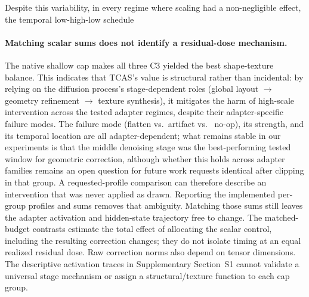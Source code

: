 \documentclass[times,twocolumn,final]{elsarticle}
\providecommand{\DIFadd}[1]{{\protect\color{blue} \sf #1}} %
\providecommand{\DIFdel}[1]{{\protect\color{red} \scriptsize #1}} %
\providecommand{\DIFaddbegin}{} %
\providecommand{\DIFaddend}{} %
\providecommand{\DIFdelbegin}{} %
\providecommand{\DIFdelend}{} %
\begin{document}
\DIFdelbegin \DIFdel{Despite this variability, in every regime where scaling had a non-negligible effect, the temporal low-high-low schedule }\DIFdelend \DIFaddbegin \paragraph{Matching scalar sums does not identify a residual-dose mechanism.}
\DIFadd{The native shallow cap makes all three }\DIFaddend C3 \DIFdelbegin \DIFdel{yielded the best shape-texture balance. This indicates that TCAS's value is structural rather than incidental: by relying on the diffusion process's stage-dependent roles (global layout $\to$ geometry refinement $\to$ texture synthesis), it mitigates the harm of high-scale intervention across the tested adapter regimes, despite their adapter-specific failure modes. The failure mode (flatten vs.\ artifact vs. \ no-op), its strength, and its temporal location are all adapter-dependent; what remains stable in our experiments is that the middle denoising stage was the best-performing tested window for geometric correction, although whether this holds across adapter families remains an open question for future work}\DIFdelend \DIFaddbegin \DIFadd{requests identical after clipping in that group. A requested-profile comparison can therefore describe an intervention that was never applied as drawn. Reporting the implemented per-group profiles and sums removes that ambiguity. Matching those sums still leaves the adapter activation and hidden-state trajectory free to change. The matched-budget contrasts estimate the total effect of allocating the scalar control, including the resulting correction changes; they do not isolate timing at an equal realized residual dose. Raw correction norms also depend on tensor dimensions. The descriptive activation traces in Supplementary Section~S1 cannot validate a universal stage mechanism or assign a structural/texture function to each cap group}\DIFaddend .
\end{document}
